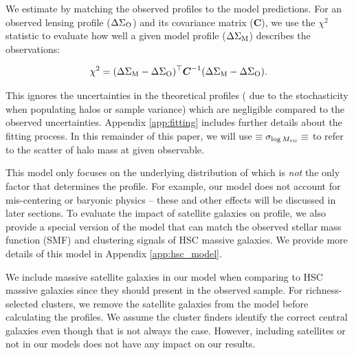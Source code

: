 \documentclass[fleqn,usenatbib,useAMS]{mnras}
\begin{document}
\begin{CJK*}{UTF8}{gbsn}
    We estimate \scatterMhaloObsSym{} by matching the observed \dsigma{} profiles to the model
    predictions. 
    For an observed lensing profile ($\Delta\Sigma_{\rm O}$) and its covariance matrix 
    ($\boldsymbol{C}$), we use the $\chi^2$ statistic to evaluate how well a given model profile 
    ($\Delta\Sigma_{\rm M}$) describes the observations:

    \begin{equation}
        \chi^{2}=(\Delta\Sigma_{\rm M}-\Delta\Sigma_{\rm O})^{\top}
                \boldsymbol{C}^{-1}(\Delta\Sigma_{\rm M}-\Delta\Sigma_{\rm O}).
        \label{eq:chi2}
    \end{equation}

    \noindent
    This ignores the uncertainties in the theoretical \dsigma{} profiles (\eg{} due to the
    stochasticity when populating halos or sample variance) which are negligible compared to the
    observed uncertainties. 
    Appendix \ref{app:fitting} includes further details about the fitting process.
    In this remainder of this paper, we will use \sigmvir{}$\equiv \sigma_{\log M_{\rm vir}} \equiv
    $\scatterMhaloObsSym{} to refer to the scatter of halo mass at given observable.

    This model only focuses on the underlying distribution of \mvir{} which is {\em not} the only 
    factor that determines the \dsigma{} profile. 
    For example, our model does not account for mis-centering or baryonic physics -- these and other
    effects will be discussed in later sections.
    To evaluate the impact of satellite galaxies on \dsigma{} profile, we also provide a special 
    version of the model that can match the observed stellar mass function (SMF) and clustering 
    signals of HSC massive galaxies. 
    We provide more details of this model in Appendix \ref{app:hsc_model}.

    We include massive satellite galaxies in our model when comparing to HSC massive galaxies since
    they should present in the observed sample.
    For richness-selected clusters, we remove the satellite galaxies from the model before
    calculating the \dsigma{} profiles.
    We assume the cluster finders identify the correct central galaxies even though that is not 
    always the case. 
    However, including satellites or not in our models does not have any impact on our results. 


\end{CJK*}
\end{document}
